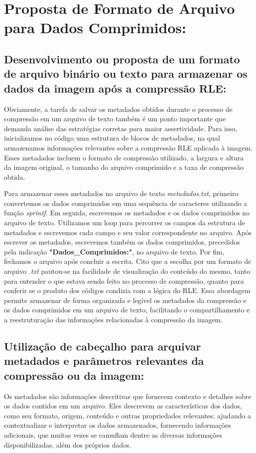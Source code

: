 \documentclass{article}
\begin{document}
\section{Proposta de Formato de Arquivo para Dados Comprimidos:}
\subsection{Desenvolvimento ou proposta de um formato de arquivo binário ou texto para armazenar os dados da imagem após a compressão RLE:}

Obviamente, a tarefa de salvar os metadados obtidos durante o processo de compressão em um arquivo de texto também é um ponto importante que demanda análise das estratégias corretas para maior assertividade. Para isso, inicializamos no código uma estrutura de blocos de metadados, na qual armazenamos informações relevantes sobre a compressão RLE aplicada à imagem. Esses metadados incluem o formato de compressão utilizado, a largura e altura da imagem original, o tamanho do arquivo comprimido e a taxa de compressão obtida.

Para armazenar esses metadados no arquivo de texto \textit{metadados.txt}, primeiro convertemos os dados comprimidos em uma sequência de caracteres utilizando a função \textit{sprintf}. Em seguida, escrevemos os metadados e os dados comprimidos no arquivo de texto. Utilizamos um loop para percorrer os campos da estrutura de metadados e escrevemos cada campo e seu valor correspondente no arquivo. Após escrever os metadados, escrevemos também os dados comprimidos, precedidos pela indicação \textbf{"Dados\_Comprimidos:"}, no arquivo de texto. Por fim, fechamos o arquivo após concluir a escrita.
Cito que a escolha por um formato de arquivo \textit{.txt} pautou-se na facilidade de visualização do conteúdo do mesmo, tanto para entender o que estava sendo feito no processo de compressão, quanto para conferir se o produto dos códigos condizia com a lógica do RLE. Essa abordagem permite armazenar de forma organizada e legível os metadados da compressão e os dados comprimidos em um arquivo de texto, facilitando o compartilhamento e a reestruturação das informações relacionadas à compressão da imagem.

\subsection{Utilização de cabeçalho para arquivar metadados e parâmetros relevantes da compressão ou da imagem:}

Os metadados são informações descritivas que fornecem contexto e detalhes sobre os dados contidos em um arquivo. Eles descrevem as características dos dados, como seu formato, origem, conteúdo e outras propriedades relevantes; ajudando a contextualizar e interpretar os dados armazenados, fornecendo informações adicionais, que muitas vezes se camuflam dentre as diversas informações disponibilizadas, além dos próprios dados.
\end{document}
